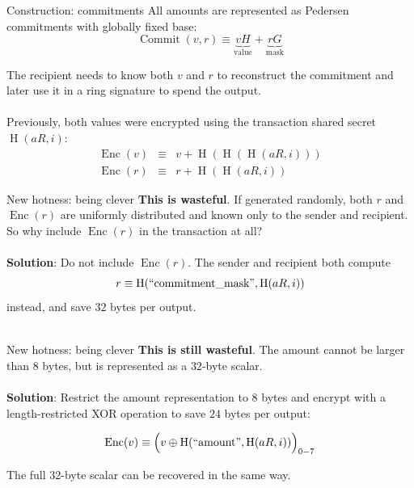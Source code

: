 \documentclass[aspectratio=169]{beamer}
\begin{document}
\begin{frame}{Construction: commitments}
All amounts are represented as Pedersen commitments with globally fixed base:
$$\operatorname{Commit}(v,r) \equiv \underbrace{vH}_{\text{value}} + \underbrace{rG}_{\text{mask}}$$

The recipient needs to know both $v$ and $r$ to reconstruct the commitment and later use it in a ring signature to spend the output. \\~\\

Previously, both values were encrypted using the transaction shared secret $\operatorname{H}(aR,i)$:
\begin{eqnarray*}
\operatorname{Enc}(v) &\equiv& v + \operatorname{H}(\operatorname{H}(\operatorname{H}(aR,i))) \\
\operatorname{Enc}(r) &\equiv& r + \operatorname{H}(\operatorname{H}(aR,i))
\end{eqnarray*}
\end{frame}


\begin{frame}{New hotness: being clever}
\textbf{This is wasteful}. If generated randomly, both $r$ and $\operatorname{Enc}(r)$ are uniformly distributed and known only to the sender and recipient. So why include $\operatorname{Enc}(r)$ in the transaction at all? \\~\\

\textbf{Solution}: Do not include $\operatorname{Enc}(r)$. The sender and recipient both compute $$r \equiv \operatorname{H}(``\text{commitment\_mask}",\operatorname{H}(aR,i))$$ instead, and save $32$ bytes per output. \\~\\
\end{frame}


\begin{frame}{New hotness: being clever}
\textbf{This is still wasteful}. The amount cannot be larger than $8$ bytes, but is represented as a $32$-byte scalar. \\~\\

\textbf{Solution}: Restrict the amount representation to $8$ bytes and encrypt with a length-restricted XOR operation to save $24$ bytes per output:

$$\operatorname{Enc}(v) \equiv \Big( v \oplus \operatorname{H}(``\text{amount}",\operatorname{H}(aR,i)) \Big)_{0-7}$$

The full 32-byte scalar can be recovered in the same way.
\end{frame}
\end{document}
